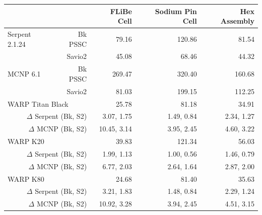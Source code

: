\documentclass[preprint,12pt]{elsarticle}
\begin{document}
\begin{table}[h]
\smallskip

\begin{tabular}{| l r | r | r | r |}
\cline{3-5}
\multicolumn{2}{c|}{}                            & FLiBe Cell   & Sodium Pin Cell & Hex Assembly  \\
\hline                                    
Serpent 2.1.24   &   Bk PSSC                     & 79.16        & 120.86          & 81.54         \\
                 &   Savio2                      & 45.08        &  68.46          &  44.32        \\
\hline                                        
MCNP 6.1         &   Bk PSSC                     & 269.47       & 320.40          & 160.68        \\
                 &   Savio2                      & 81.03        & 199.15          & 112.25        \\
\hline                       
\multicolumn{2}{|l|}{WARP Titan Black }          &  25.78       & 81.18           & 34.91         \\
\multicolumn{2}{|r|}{$\Delta$ Serpent (Bk, S2)}  &  3.07,  1.75  & 1.49,  0.84      & 2.34,  1.27    \\
\multicolumn{2}{|r|}{$\Delta$ MCNP    (Bk, S2)}  &  10.45, 3.14  & 3.95,  2.45      & 4.60,  3.22    \\
\hline
\multicolumn{2}{|l|}{WARP K20 }                  & 39.83        & 121.34          & 56.03         \\
\multicolumn{2}{|r|}{$\Delta$ Serpent (Bk, S2)}  &  1.99,  1.13  & 1.00,  0.56      & 1.46,  0.79    \\
\multicolumn{2}{|r|}{$\Delta$ MCNP    (Bk, S2)}  &  6.77,  2.03  & 2.64,  1.64      & 2.87,  2.00    \\
\hline
\multicolumn{2}{|l|}{WARP K80   }                & 24.68        & 81.40           & 35.63         \\
\multicolumn{2}{|r|}{$\Delta$ Serpent (Bk, S2)}  & 3.21,  1.83   &  1.48,  0.84     &  2.29,  1.24   \\
\multicolumn{2}{|r|}{$\Delta$ MCNP    (Bk, S2)}  & 10.92, 3.28   &  3.94,  2.45     &  4.51,  3.15   \\
\hline
\end{tabular}
\end{table}
\end{document}
